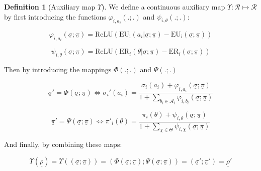 \documentclass{article}
\theoremstyle{definition}
\newtheorem{definition}{Definition}[section]
\begin{document}
\begin{definition}[Auxiliary map $\Upsilon$]
\label{def:Upsilon}
We define a continuous auxiliary map $\Upsilon : \mathcal{R} \mapsto \mathcal{R}$ by first introducing the functions $\varphi_{i,a_i}(.;.)$ and $\psi_{i,\theta}(.;.)$:

    \begin{equation}
    \label{eq:varphiDef}
        \varphi_{i,a_i}(\underline{\sigma};\underline{\pi}) = 
        \mathrm{ReLU} 
        \left (
        \mathrm{EU_i}(a_i|\underline{\sigma};\underline{\pi})
        -
        \mathrm{EU_i}(\underline{\sigma};\underline{\pi})
        \right )
    \end{equation}

    \begin{equation}
    \label{eq:psiDef}
        \psi_{i,\theta}(\underline{\sigma};\underline{\pi}) = 
        \mathrm{ReLU} 
        \left (
        \mathrm{ER}_i(\theta | \underline{\sigma};\underline{\pi})
        -
        \mathrm{ER}_i(\underline{\sigma};\underline{\pi})
        \right )
    \end{equation}

Then by introducing the mappings $\Phi(.;.)$ and $\Psi(.;.)$

    \begin{equation}
        \underline{\sigma}' = \Phi(\underline{\sigma};\underline{\pi})
        \iff
        \sigma_i'(a_i) = \frac{\sigma_i(a_i) + \varphi_{i,a_i}(\underline{\sigma};\underline{\pi})}{1 + \sum_{b_i \in \mathcal{A}_i} \varphi_{i,b_i}(\underline{\sigma};\underline{\pi})} 
    \end{equation}

    \begin{equation}
        \underline{\pi}' = \Psi(\underline{\sigma};\underline{\pi})
        \iff
        \pi'_i(\theta) = \frac{\pi_i(\theta) + \psi_{i,\theta}(\underline{\sigma};\underline{\pi})}{1 + \sum_{\chi \in \Theta} \psi_{i,\chi}(\underline{\sigma};\underline{\pi})} 
    \end{equation}

And finally, by combining these maps:
    
    \begin{equation}
        \Upsilon(\underline{\rho})
        =
        \Upsilon((\underline{\sigma};\underline{\pi}))
        =
        (\Phi(\underline{\sigma};\underline{\pi}); \Psi(\underline{\sigma};\underline{\pi})) 
        =
        (\underline{\sigma}';\underline{\pi}') 
        =
        \underline{\rho}'
    \end{equation}
    
\end{definition}
\end{document}
